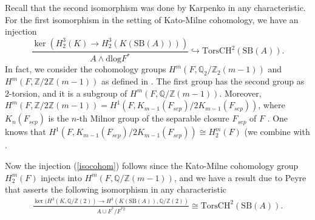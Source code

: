 \documentclass{amsart}
\numberwithin{equation}{section}
\newcommand{\Z}{\mathbb{Z}}
\newcommand{\Q}{\mathbb{Q}}
\newcommand{\dlog}{\mathrm{dlog}}
\newcommand{\torsChow}{\mathrm{Tors CH}^2}
\newcommand{\SevBrauer}{\mathrm{SB}}
\begin{document}
Recall that the second isomorphism was done by Karpenko in any characteristic. 
For the first isomorphism in the setting of Kato-Milne cohomology, we have an injection
\begin{equation}\label{isocohom}
	\frac{\ker(H_2^3(K) \to H_2^3(K(\SevBrauer(A))))}{A \wedge \dlog F^*} \hookrightarrow \torsChow(\SevBrauer(A)).
\end{equation}
In fact, we consider the cohomology groups $H^{m}(F, \Q_2/\Z_2(m-1))$ and\break $H^{m}(F, \Z/2\Z(m-1))$ as defined in \cite[Appendix A]{GaribaldiMerkurjevSerre_CohInvariants}. 
The first group has the second group as $2$-torsion, and it is a subgroup of $H^{m}(F, \Q/\Z(m-1))$. 
Moreover, $H^{m}(F, \Z/2\Z(m-1))=H^1(F, K_{m-1}(F_{sep})/2K_{m-1}(F_{sep}))$, where $K_n(F_{sep})$ is the $n$-th Milnor group of the separable closure $F_{sep}$ of $F$ \cite[Equation (A.4)]{GaribaldiMerkurjevSerre_CohInvariants}. 
One knows that $H^1(F, K_{m-1}(F_{sep})/2K_{m-1}(F_{sep}))\cong H_2^{m}(F)$ (we combine \cite{Kat1} with \cite[(5.12)]{MR1154404}.

Now the injection (\ref{isocohom}) follows since the Kato-Milne cohomology group $H^m_2(F)$ injects into $H^m(F, \Q/\Z(m-1))$, and we have a result due to Peyre \cite[Theorem 4.1]{PeyreProductsSeveriBrauer} that asserts the following isomorphism in any characteristic
\begin{align*}
	\frac{\ker(H^3(K, \Q/\Z(2)) \to H^3(K(\SevBrauer(A)), \Q/\Z(2))}{A \cup F^*/F^{*2}} \cong \torsChow(\SevBrauer(A)).
\end{align*}
\end{document}

